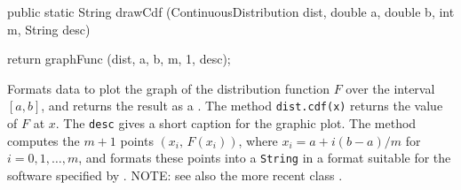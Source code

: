 \begin{code}

   public static String drawCdf (ContinuousDistribution dist, double a,
                                 double b, int m, String desc)\begin{hide} {
      return graphFunc (dist, a, b, m, 1, desc);
   }\end{hide}
\end{code}
 \begin{tabb}
  Formats data to plot the graph of the distribution function $F$ over the
  interval $[a,b]$, and returns the result as a .
  The method \texttt{dist.cdf(x)} returns the value of $F$ at $x$.
  The  \texttt{desc} gives a short caption for the graphic plot.
  The method computes the $m+1$ points $(x_i,\, F (x_i))$,
  where $x_i = a + i (b-a)/m$ for $i=0,1,\ldots,m$, and formats these points
  into a \texttt{String} in a format suitable for the
  software specified by .
  NOTE: see also the more recent class
  .
 \end{tabb}
\begin{htmlonly}
\end{htmlonly}
